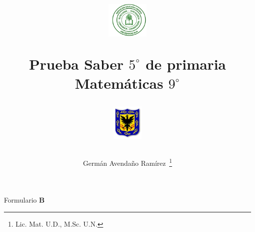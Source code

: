 \documentclass[10pt,addpoints]{exam}
\begin{document}
\title{\begin{minipage}{.2\textwidth}
        \includegraphics[height=1.75cm]{Images/logo-colegio.png}
       \end{minipage}
\begin{minipage}{.55\textwidth}
 \begin{center}
Prueba Saber $5^{\circ}$ de primaria\\Matemáticas $9^{\circ}$
\end{center}
\end{minipage}
\begin{minipage}{.2\textwidth}
\includegraphics[height=1.75cm]{Images/logo-sed.png} 
\end{minipage}
}
\author{Germ\'{a}n Avendaño Ram\'{i}rez~\thanks{Lic. Mat. U.D., M.Sc. U.N.}}
\date{}
\maketitle
\begin{center}
\end{center}
Formulario \textbf{B}
\end{document}
